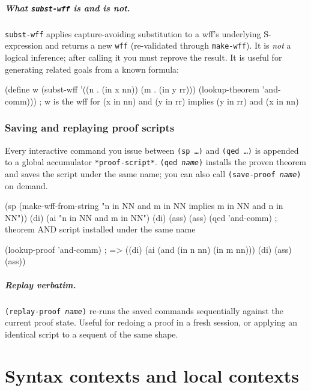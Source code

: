 \documentclass{amsbook}[openany]
\theoremstyle{definition}
\theoremstyle{remark}
\theoremstyle{remark}
\begin{document}
\paragraph{What \texttt{subst-wff} is and is not.}
\texttt{subst-wff} applies capture-avoiding substitution to a wff's
underlying S-expression and returns a new \texttt{wff} (re-validated
through \texttt{make-wff}).  It is \emph{not} a logical inference;
after calling it you must reprove the result.  It is useful for
generating related goals from a known formula:

\begin{VNBcode}
(define w
  (subst-wff '((n . (in x nn)) (m . (in y rr)))
             (lookup-theorem 'and-comm)))
; w is the wff for (x in nn) and (y in rr) implies (y in rr) and (x in nn)
\end{VNBcode}

\subsection{Saving and replaying proof scripts}
\label{sec:replay}

Every interactive command you issue between \texttt{(sp\ \ldots)} and
\texttt{(qed\ \ldots)} is appended to a global accumulator
\texttt{*proof-script*}.  \texttt{(qed \textit{name})} installs the
proven theorem and saves the script under the same name; you can also
call \texttt{(save-proof \textit{name})} on demand.

\begin{VNBcode}
(sp (make-wff-from-string "n in NN and m in NN implies m in NN and n in NN"))
(di) (ai "n in NN and m in NN") (di) (ass) (ass)
(qed 'and-comm)
; theorem AND script installed under the same name

(lookup-proof 'and-comm)
; => ((di) (ai (and (in n nn) (in m nn))) (di) (ass) (ass))
\end{VNBcode}

\paragraph{Replay verbatim.}
\texttt{(replay-proof \textit{name})} re-runs the saved commands
sequentially against the current proof state.  Useful for redoing a
proof in a fresh session, or applying an identical script to a sequent
of the same shape.

\chapter{Syntax contexts and local contexts}
\label{sec:syntax-contexts}
\end{document}
